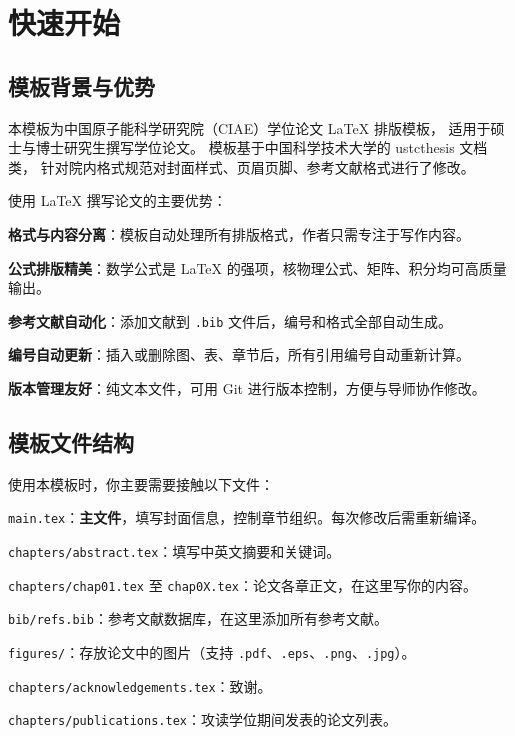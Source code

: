 

\chapter{快速开始}\label{chap:quickstart}

\section{模板背景与优势}

本模板为中国原子能科学研究院（CIAE）学位论文 \LaTeX{} 排版模板，
适用于硕士与博士研究生撰写学位论文。
模板基于中国科学技术大学的 ustcthesis 文档类，
针对院内格式规范对封面样式、页眉页脚、参考文献格式进行了修改。

使用 \LaTeX{} 撰写论文的主要优势：

\begin{compactitem}
    \item \textbf{格式与内容分离}：模板自动处理所有排版格式，作者只需专注于写作内容。
    \item \textbf{公式排版精美}：数学公式是 \LaTeX{} 的强项，核物理公式、矩阵、积分均可高质量输出。
    \item \textbf{参考文献自动化}：添加文献到 \texttt{.bib} 文件后，编号和格式全部自动生成。
    \item \textbf{编号自动更新}：插入或删除图、表、章节后，所有引用编号自动重新计算。
    \item \textbf{版本管理友好}：纯文本文件，可用 Git 进行版本控制，方便与导师协作修改。
\end{compactitem}

\section{模板文件结构}

使用本模板时，你主要需要接触以下文件：

\begin{compactitem}
    \item \texttt{main.tex}：\textbf{主文件}，填写封面信息，控制章节组织。每次修改后需重新编译。
    \item \texttt{chapters/abstract.tex}：填写中英文摘要和关键词。
    \item \texttt{chapters/chap01.tex} 至 \texttt{chap0X.tex}：论文各章正文，在这里写你的内容。
    \item \texttt{bib/refs.bib}：参考文献数据库，在这里添加所有参考文献。
    \item \texttt{figures/}：存放论文中的图片（支持 \texttt{.pdf}、\texttt{.eps}、\texttt{.png}、\texttt{.jpg}）。
    \item \texttt{chapters/acknowledgements.tex}：致谢。
    \item \texttt{chapters/publications.tex}：攻读学位期间发表的论文列表。
\end{compactitem}

